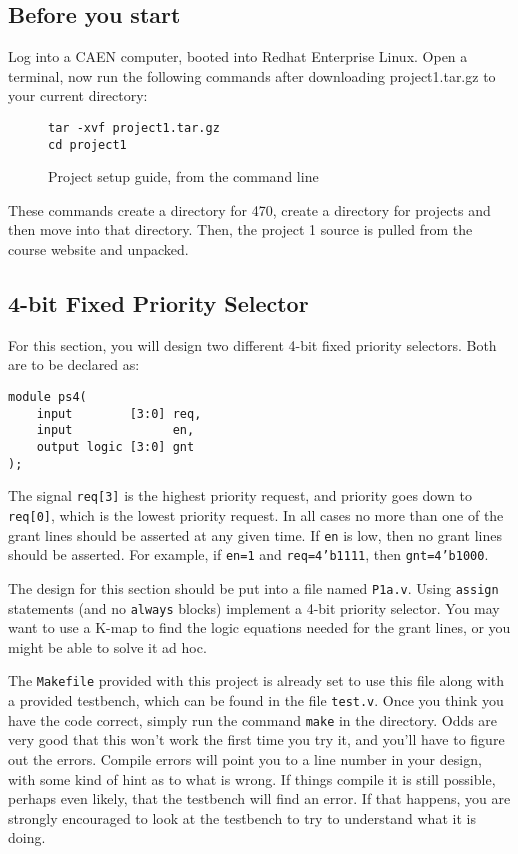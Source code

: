 \documentclass{article}
\begin{document}
\subsection{Before you start}
Log into a CAEN computer, booted into Redhat Enterprise Linux. Open a terminal,
now run the following commands after downloading project1.tar.gz to your current directory:

\begin{figure}[H]
	\begin{verbatim}
tar -xvf project1.tar.gz
cd project1
	\end{verbatim}
	\vspace*{-12pt}
	\caption{Project setup guide, from the command line}
\end{figure}

These commands create a directory for 470, create a directory for projects and
then move into that directory. Then, the project 1 source is pulled from the
course website and unpacked. 

\subsection{4-bit Fixed Priority Selector}
For this section, you will design two different 4-bit fixed priority selectors.
Both are to be declared as:

\begin{verbatim}
module ps4(
    input        [3:0] req,
    input              en,
    output logic [3:0] gnt
);
\end{verbatim}

The signal \texttt{req[3]} is the highest priority request, and priority goes
down to \texttt{req[0]}, which is the lowest priority request. In all cases no
more than one of the grant lines should be asserted at any given time. If
\texttt{en} is low, then no grant lines should be asserted. For example, if
\texttt{en=1} and \texttt{req=4'b1111}, then \texttt{gnt=4'b1000}.

The design for this section should be put into a file named \texttt{P1a.v}.
Using \texttt{assign} statements (and no \texttt{always} blocks) implement a
4-bit priority selector. You may want to use a K-map to find the logic equations
needed for the grant lines, or you might be able to solve it ad hoc. 

The \texttt{Makefile} provided with this project is already set to use this file
along with a provided testbench, which can be found in the file \texttt{test.v}.
Once you think you have the code correct, simply run the command \texttt{make}
in the directory. Odds are very good that this won't work the first time you try
it, and you'll have to figure out the errors. Compile errors will point you to a
line number in your design, with some kind of hint as to what is wrong. If
things compile it is still possible, perhaps even likely, that the testbench
will find an error. If that happens, you are strongly encouraged to look at the
testbench to try to understand what it is doing. 
\end{document}
